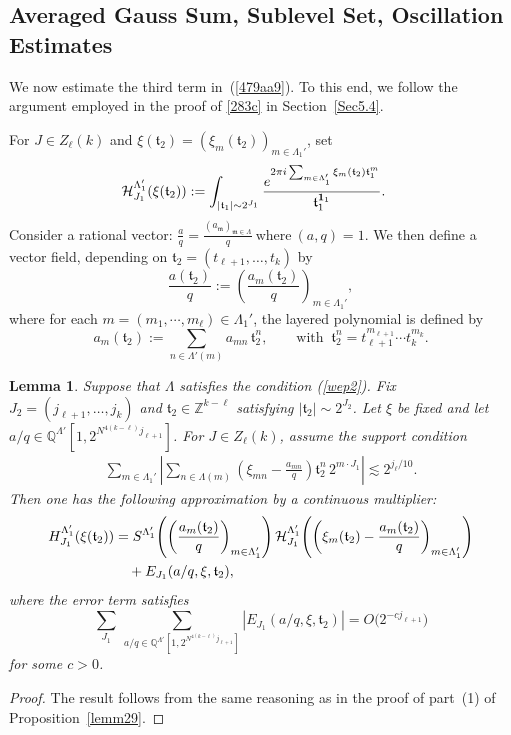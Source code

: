 \documentclass[10pt,a4paper]{amsart}
\newtheorem{lemma}{Lemma}\numberwithin{lemma}{section}
\numberwithin{equation}{section}
\begin{document}
\subsection{Averaged Gauss Sum, Sublevel Set, Oscillation Estimates}\label{5.3}
We now estimate the third term in~(\ref{479aa9}). To this end, we follow the argument employed in the proof of \eqref{283c} in Section~\ref{Sec5.4}.


 For $J\in Z_{\ell}(k)$ and $\xi(\mathfrak{t}_2)=(\xi_{m}(\mathfrak{t}_2))_{m\in \Lambda_1'}$,  set
	\begin{align*} 
		\mathcal{H}_{J_1}^{\Lambda'_1}(\xi(\mathfrak{t}_2) ) &:=\int_{|\mathfrak{t}_1|\sim 2^{J_1}} \frac{e^{2\pi i \sum_{m\in \Lambda'_1} \xi_{m}(\mathfrak{t}_2)\mathfrak{t}_1^{m}} }{\mathfrak{t}_1^{{\bf 1}_1}}.
	\end{align*} 
	Consider a rational vector: 
	$
	\frac{a}{q}=\frac{(a_{\mathfrak{m}})_{\mathfrak{m}\in \Lambda}}{q}  \ \text{where}  \ (a,q)=1.$ We then
	define a vector field, depending on $\mathfrak{t}_2=(t_{\ell+1},\dots,t_k)$ by
	\[
	\frac{a(\mathfrak{t}_2)}{q}:=\left( \frac{a_{m}(\mathfrak{t}_2)}{q} \right)_{m\in \Lambda_{1}'},
	\]
	where   for each $m=(m_1,\cdots,m_{\ell})\in \Lambda_1'$,  the layered polynomial is defined by
	\[
	a_{m}(\mathfrak{t}_2):=\sum_{n \in \Lambda'(m)} a_{mn}\,\mathfrak{t}_2^{n}, 
	\qquad \text{with } \ \mathfrak{t}_2^n=t_{\ell+1}^{m_{\ell+1}}\cdots t_k^{m_k}.
	\]
	
	\begin{lemma}\label{kw999}
Suppose that $\Lambda$ satisfies   the  condition (\ref{wep2}).  Fix $J_2=(j_{\ell+1},\ldots,j_k)$ and
$\mathfrak{t}_2\in\mathbb{Z}^{k-\ell}$ satisfying
$|\mathfrak{t}_2|\sim2^{J_2}$.
Let $\xi$ be fixed and let $a/q \in \mathbb{Q}^{\Lambda'}\!\left[1,2^{N^{4(k-\ell)} j_{\ell+1}}\right]$. 
For $J\in Z_{\ell}(k)$, assume the support condition
\begin{align}\label{um199}
\sum_{m\in \Lambda_1'}\left| 
\sum_{n\in\Lambda(m)}
\left( \xi_{mn}-\frac{a_{mn}}{q} \right)\mathfrak{t}_2^n \, 2^{m\cdot J_1} 
\right|
\lesssim 2^{j_{\ell}/10}.
\end{align}
Then one has the following approximation by a continuous multiplier:
\begin{align}\label{um1990}
H^{\Lambda'_{1}}_{J_1}( \xi(\mathfrak{t}_2) )
&=  S^{\Lambda'_{1}}\!\left( \left( \frac{a_{m}(\mathfrak{t}_2)}{q}\right)_{m\in \Lambda'_{1}}\right)  
\mathcal{H}^{\Lambda'_{1}}_{J_1}\!\left(\left(\xi_{m}(\mathfrak{t}_2)-\frac{a_{m}(\mathfrak{t}_2)}{q}\right)_{m\in \Lambda'_{1}}\right) \notag \\
&\quad + E_{J_1}(a/q,\xi,\mathfrak{t}_2),
\end{align}
where the error term satisfies
\[
\sum_{J_1} \ \sum_{a/q \in \mathbb{Q}^{\Lambda'}[1,2^{N^{4(k-\ell)} j_{\ell+1}}]}  
|E_{J_1}(a/q,\xi,\mathfrak{t}_2)|
= O\bigl(2^{-c j_{\ell+1}}\bigr)
\]
for some $c>0$.
\end{lemma}
	 \begin{proof}
The  result follows from the same reasoning as in the proof of part~(1) of Proposition~\ref{lemm29}.
\end{proof}  
\end{document}
